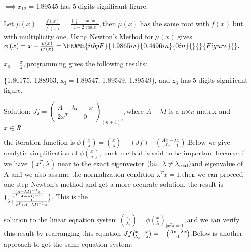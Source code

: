 \documentclass{article}
\begin{document}
$\implies x_{12}=$1.89545 has 5-digits significant figure.

Let $\mu \left( x\right) =\frac{f\left( x\right) }{f^{\prime }\left(
x\right) }=\frac{\left( \frac{x}{2}-\sin x\right) }{1-2\cos x},$then $\mu
\left( x\right) $ has the same root with $f\left( x\right) $ but with
multiplicity one. Using Newton's Method for $\mu \left( x\right) $ gives: $%
\phi \left( x\right) =x-\frac{\mu \left( x\right) }{\mu ^{\prime }\left(
x\right) }=\FRAME{itbpF}{1.9865in}{0.4696in}{0in}{}{}{Figure}{\special%
{language "Scientific Word";type "GRAPHIC";display "USEDEF";valid_file
"T";width 1.9865in;height 0.4696in;depth 0in;original-width
2.5624in;original-height 0.5941in;cropleft "0";croptop "1";cropright
"1";cropbottom "0";tempfilename 'NWVUWL04.wmf';tempfile-properties "XPR";}}.$

$x_{0}=\frac{\pi }{2},$programming gives the following results:

\{1.80175, 1.88963, x$_{3}=$1.89547, 1.89549, 1.89549\}, and x$_{3}$ has
5-digits significant figure.


Solution: $Jf=\left( 
\begin{array}{cc}
A-\lambda I & -x \\ 
2x^{T} & 0%
\end{array}%
\right) _{\left( n+1\right) ^{2}},$where $A-\lambda I$ is a n$\times n$
matrix and $x\in R.$ 

the iteration function is $\phi \binom{x}{\lambda }=\binom{x}{\lambda }%
-\left( Jf\right) ^{-1}\binom{Ax-\lambda x}{x^{T}x-1}.$Below we give
analytic simplification of $\phi \binom{x}{\lambda },$ such method is said
to be important because if we have $\left( x^{T},\lambda \right) $ near to
the exact eigenvector $\left( \text{but }\lambda \neq \lambda _{\func{real}%
}\right) $and eigenvalue of A and we also assume the normalization condition
x$^{T}x=1$,then we can proceed one-step Newton's method and get a more
accurate solution, the result is $\binom{\frac{\left( A-\lambda I\right)
^{-1}x}{x^{T}\left( A-\lambda I\right) ^{-1}x}}{\lambda +\frac{1}{%
x^{T}\left( A-\lambda I\right) ^{-1}x}}.$ This is the 

solution to the linear equation system $\binom{x_{s}}{\lambda _{s}}=\phi 
\binom{x}{\lambda }_{|x^{T}x=1},$and we can verify this result by
rearranging this equation $Jf\binom{x_{s}-x}{\lambda _{s}-\lambda }=-\binom{%
Ax-\lambda x}{0}.$Below is another approach to get the same equation system:
\end{document}
